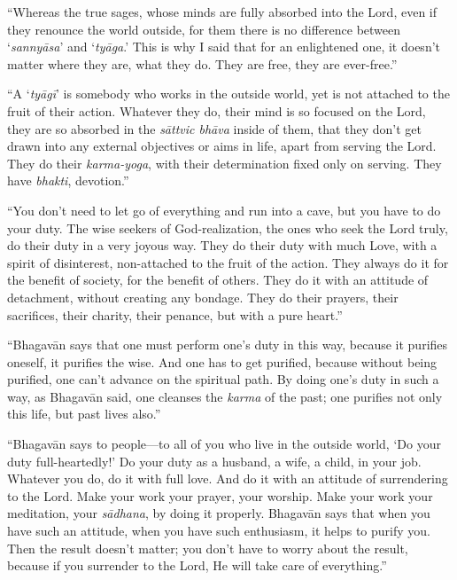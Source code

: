 \documentclass[12pt, twoside, openright]{memoir}
\begin{document}
\enquote{Whereas the true sages, whose minds are fully absorbed into the Lord, even if they renounce the world outside, for them there is no difference between \enquote{\textit{sannyāsa}} and \enquote{\textit{tyāga}.} This is why I said that for an enlightened one, it doesn’t matter where they are, what they do. They are free, they are ever-free.}

\enquote{A \enquote{\textit{tyāgī}} is somebody who works in the outside world, yet is not attached to the fruit of their action. Whatever they do, their mind is so focused on the Lord, they are so absorbed in the \textit{sāttvic bhāva} inside of them, that they don’t get drawn into any external objectives or aims in life, apart from serving the Lord. They do their \textit{karma-yoga}, with their determination fixed only on serving. They have \textit{bhakti}, devotion.}

\enquote{You don’t need to let go of everything and run into a cave, but you have to do your duty. The wise seekers of God-realization, the ones who seek the Lord truly, do their duty in a very joyous way. They do their duty with much Love, with a spirit of disinterest, non-attached to the fruit of the action. They always do it for the benefit of society, for the benefit of others. They do it with an attitude of detachment, without creating any bondage. They do their prayers, their sacrifices, their charity, their penance, but with a pure heart.}

\enquote{Bhagavān says that one must perform one’s duty in this way, because it purifies oneself, it purifies the wise. And one has to get purified, because without being purified, one can’t advance on the spiritual path. By doing one’s duty in such a way, as Bhagavān said, one cleanses the \textit{karma} of the past; one purifies not only this life, but past lives also.}

\enquote{Bhagavān says to people---to all of you who live in the outside world, \enquote{Do your duty full-heartedly!} Do your duty as a husband, a wife, a child, in your job. Whatever you do, do it with full love. And do it with an attitude of surrendering to the Lord. Make your work your prayer, your worship. Make your work your meditation, your \textit{sādhana}, by doing it properly. Bhagavān says that when you have such an attitude, when you have such enthusiasm, it helps to purify you. Then the result doesn’t matter; you don’t have to worry about the result, because if you surrender to the Lord, He will take care of everything.}
\end{document}
